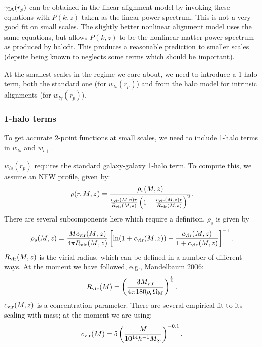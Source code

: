 \documentclass[onecolumn,amsmath,aps,fleqn, superscriptaddress]{revtex4}
\begin{document}
$\gamma_{\rm IA}(r_p)$ can be obtained in the linear alignment model by invoking these equations with $P(k,z)$ taken as the linear power spectrum. This is not a very good fit on small scales. The slightly better nonlinear alignment model uses the same equations, but allows $P(k,z)$ to be the nonlinear matter power spectrum as produced by halofit. This produces a reasonable prediction to smaller scales (depsite being known to neglects some terms which should be important). 

At the smallest scales in the regime we care about, we need to introduce a 1-halo term, both the standard one (for $w_{ls}(r_p)$) and from the halo model for intrinsic alignments (for $w_{l\gamma}(r_p)$). 

\subsubsection*{1-halo terms}
To get accurate 2-point functions at small scales, we need to include 1-halo terms in $w_{ls}$ and $w_{l+}$. 

$w_{ls}(r_p)$ requires the standard galaxy-galaxy 1-halo term. To compute this, we assume an NFW profile, given by:
\begin{equation}
\rho(r, M, z) = \frac{\rho_s(M,z)}{\frac{c_{\rm vir}(M,z)r}{R_{\rm vir}(M,z)}\left(1+\frac{c_{\rm vir}(M,z)r}{R_{\rm vir}(M,z)}\right)^2}.
\label{nfw}
\end{equation}
There are several subcomponents here which require a definiton. $\rho_s$ is given by
\begin{equation}
\rho_s(M,z) = \frac{Mc_{\rm vir}(M,z)}{4 \pi R_{\rm vir}(M,z)}\left[{\rm ln} (1+ c_{\rm vir}(M,z)) - \frac{c_{\rm vir}(M,z)}{1+c_{\rm vir}(M,z)}\right]^{-1}.
\label{rhos}
\end{equation}
$R_{\rm vir}(M,z)$ is the virial radius, which can be defined in a number of different ways. At the moment we have followed, e.g., Mandelbaum 2006:
\begin{equation}
R_{\rm vir}(M) = \left(\frac{3 M_{\rm vir}}{4 \pi 180 \rho_c \Omega_{\rm M}} \right)^{\frac{1}{3}}.
\label{Rvir}
\end{equation}
$c_{\rm vir}(M,z)$ is a concentration parameter. There are several empirical fit to its scaling with mass; at the moment we are using:
\begin{equation}
c_{\rm vir}(M) = 5\left(\frac{M}{10^{14}h^{-1}M_{\odot}}\right)^{-0.1}.
\label{cvir}
\end{equation}
\end{document}
